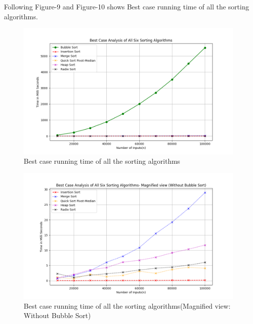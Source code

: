 \documentclass[a4paper,12pt]{report}
\begin{document}
Following Figure-9 and Figure-10 shows Best case running time of all the sorting algorithms. 
\begin{figure}[H]
	\centering
	\includegraphics[width=1.1\textwidth]{./Bestofall.png}
	\caption{Best case running time of all the sorting algorithms}
	\label{fig:Best of all}
\end{figure}

\begin{figure}[H]
	\centering
	\includegraphics[width=1.1\textwidth]{./BestofallMagnified.png}
	\caption{Best case running time of all the sorting algorithms(Magnified view: Without Bubble Sort)}
	\label{fig:Best of all Magnified}
\end{figure}
\end{document}
